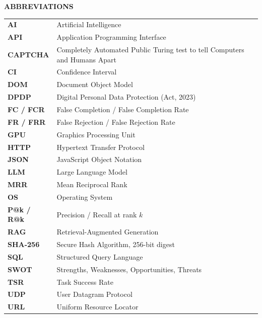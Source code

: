{}
{\singlespacing\tableofcontents}
\clearpage
{}
{}
{\singlespacing\listoffigures}
\clearpage
{}
{}
{\singlespacing\listoftables}
\clearpage

{}
\begin{center}{\Large\bfseries ABBREVIATIONS\par}\end{center}
\vspace{6pt}
{\singlespacing
\begin{tabular}{@{}p{3cm}l@{}}
\textbf{AI} & Artificial Intelligence\\
\textbf{API} & Application Programming Interface\\
\textbf{CAPTCHA} & Completely Automated Public Turing test to tell Computers and Humans Apart\\
\textbf{CI} & Confidence Interval\\
\textbf{DOM} & Document Object Model\\
\textbf{DPDP} & Digital Personal Data Protection (Act, 2023)\\
\textbf{FC / FCR} & False Completion / False Completion Rate\\
\textbf{FR / FRR} & False Rejection / False Rejection Rate\\
\textbf{GPU} & Graphics Processing Unit\\
\textbf{HTTP} & Hypertext Transfer Protocol\\
\textbf{JSON} & JavaScript Object Notation\\
\textbf{LLM} & Large Language Model\\
\textbf{MRR} & Mean Reciprocal Rank\\
\textbf{OS} & Operating System\\
\textbf{P@k / R@k} & Precision / Recall at rank $k$\\
\textbf{RAG} & Retrieval-Augmented Generation\\
\textbf{SHA-256} & Secure Hash Algorithm, 256-bit digest\\
\textbf{SQL} & Structured Query Language\\
\textbf{SWOT} & Strengths, Weaknesses, Opportunities, Threats\\
\textbf{TSR} & Task Success Rate\\
\textbf{UDP} & User Datagram Protocol\\
\textbf{URL} & Uniform Resource Locator\\
\end{tabular}}
\clearpage
